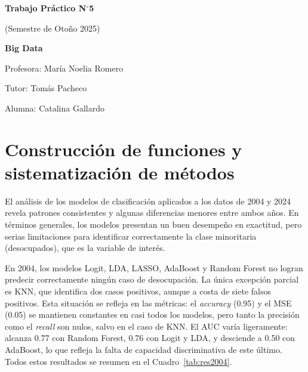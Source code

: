 \documentclass[11pt,a4paper]{article}
\begin{document}
\begin{titlepage}
\centering
\vspace*{3cm}

{\LARGE\bfseries Trabajo Práctico N$^{\circ}$5\par}
\vspace{0.4cm}
{\large (Semestre de Otoño 2025)\par}
\vspace{0.3cm}
{\large\bfseries Big Data\par}

\vfill

{\large Profesora: María Noelia Romero\par}
\vspace{0.2cm}
{\large Tutor: Tomás Pacheco\par}
\vspace{0.2cm}
{\large Alumna: Catalina Gallardo\par}

\vfill
\end{titlepage}

\section*{Construcción de funciones y sistematización de métodos}

El análisis de los modelos de clasificación aplicados a los datos de 2004 y 2024 revela
patrones consistentes y algunas diferencias menores entre ambos años. En términos generales,
los modelos presentan un buen desempeño en exactitud, pero serias limitaciones para
identificar correctamente la clase minoritaria (desocupados), que es la variable de interés.

En 2004, los modelos Logit, LDA, LASSO, AdaBoost y Random Forest no logran predecir
correctamente ningún caso de desocupación. La única excepción parcial es KNN, que identifica
dos casos positivos, aunque a costa de siete falsos positivos. Esta situación se refleja en
las métricas: el \textit{accuracy} (0.95) y el MSE (0.05) se mantienen constantes en casi
todos los modelos, pero tanto la precisión como el \textit{recall} son nulos, salvo en el caso
de KNN. El AUC varía ligeramente: alcanza 0.77 con Random Forest, 0.76 con Logit y LDA, y
desciende a 0.50 con AdaBoost, lo que refleja la falta de capacidad discriminativa de este
último. Todos estos resultados se resumen en el Cuadro~\ref{tab:res2004}.
\end{document}
